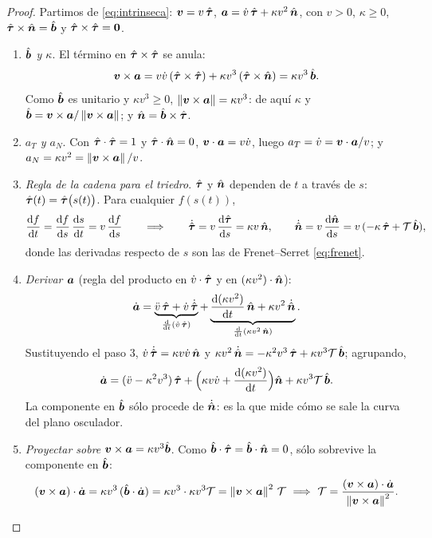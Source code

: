 \begin{proof}
Partimos de \eqref{eq:intrinseca}: $\bm{v}=v\,\hat{\bm{\tau}}$,
$\bm{a}=\dot v\,\hat{\bm{\tau}}+\kappa v^{2}\,\hat{\bm{n}}$, con $v>0$, $\kappa\ge0$,
$\hat{\bm{\tau}}\times\hat{\bm{n}}=\hat{\bm{b}}$ y $\hat{\bm{\tau}}\times\hat{\bm{\tau}}=\bm{0}$.
\begin{enumerate}
  \item \emph{$\hat{\bm{b}}$ y $\kappa$}. El término en $\hat{\bm{\tau}}\times\hat{\bm{\tau}}$ se anula:
  \[
    \bm{v}\times\bm{a}=v\dot v\,(\hat{\bm{\tau}}\times\hat{\bm{\tau}})+\kappa v^{3}\,(\hat{\bm{\tau}}\times\hat{\bm{n}})=\kappa v^{3}\,\hat{\bm{b}} .
  \]
  Como $\hat{\bm{b}}$ es unitario y $\kappa v^{3}\ge0$, $\left\lVert \bm{v}\times\bm{a}\right\rVert=\kappa v^{3}$: de aquí
  $\kappa$ y $\hat{\bm{b}}=\bm{v}\times\bm{a}/\left\lVert \bm{v}\times\bm{a}\right\rVert$; y $\hat{\bm{n}}=\hat{\bm{b}}\times\hat{\bm{\tau}}$.
  \item \emph{$a_{T}$ y $a_{N}$}. Con $\hat{\bm{\tau}}\cdot\hat{\bm{\tau}}=1$ y $\hat{\bm{\tau}}\cdot\hat{\bm{n}}=0$,
  $\bm{v}\cdot\bm{a}=v\dot v$, luego $a_{T}=\dot v=\bm{v}\cdot\bm{a}/v$; y
  $a_{N}=\kappa v^{2}=\left\lVert \bm{v}\times\bm{a}\right\rVert/v$.
  \item \emph{Regla de la cadena para el triedro}. $\hat{\bm{\tau}}$ y $\hat{\bm{n}}$ dependen de $t$
  a través de $s$: $\hat{\bm{\tau}}(t)=\hat{\bm{\tau}}\bigl(s(t)\bigr)$. Para cualquier $f(s(t))$,
  \[
    \od{f}{t}=\od{f}{s}\,\od{s}{t}=v\,\od{f}{s}
    \qquad\Longrightarrow\qquad
    \dot{\utau}=v\,\od{\utau}{s}=\kappa v\,\un,\qquad
    \dot{\un}=v\,\od{\un}{s}=v\,(-\kappa\,\utau+\tors\,\ub),
  \]
  donde las derivadas respecto de $s$ son las de Frenet--Serret \eqref{eq:frenet}.
  \item \emph{Derivar $\bm{a}$} (regla del producto en $\dot v\cdot\hat{\bm{\tau}}$ y en $(\kappa v^{2})\cdot\hat{\bm{n}}$):
  \[
    \dot{\bm{a}}=\underbrace{\ddot v\,\hat{\bm{\tau}}+\dot v\,\dot{\hat{\bm{\tau}}}}_{\frac{\mathop{}\!\mathrm{d} }{\mathop{}\!\mathrm{d} t}(\dot v\,\hat{\bm{\tau}})}
    +\underbrace{\frac{\mathop{}\!\mathrm{d} (\kappa v^{2})}{\mathop{}\!\mathrm{d} t}\,\hat{\bm{n}}+\kappa v^{2}\,\dot{\hat{\bm{n}}}}_{\frac{\mathop{}\!\mathrm{d} }{\mathop{}\!\mathrm{d} t}(\kappa v^{2}\,\hat{\bm{n}})} .
  \]
  Sustituyendo el paso 3, $\dot v\,\dot{\hat{\bm{\tau}}}=\kappa v\dot v\,\hat{\bm{n}}$ y
  $\kappa v^{2}\,\dot{\hat{\bm{n}}}=-\kappa^{2}v^{3}\,\hat{\bm{\tau}}+\kappa v^{3}\mathcal{T}\,\hat{\bm{b}}$; agrupando,
  \[
    \dot{\bm{a}}=(\ddot v-\kappa^{2}v^{3})\,\hat{\bm{\tau}}
    +\Bigl(\kappa v\dot v+\frac{\mathop{}\!\mathrm{d} (\kappa v^{2})}{\mathop{}\!\mathrm{d} t}\Bigr)\hat{\bm{n}}
    +\kappa v^{3}\mathcal{T}\,\hat{\bm{b}} .
  \]
  La componente en $\hat{\bm{b}}$ sólo procede de $\dot{\hat{\bm{n}}}$: es la que mide cómo se sale
  la curva del plano osculador.
  \item \emph{Proyectar sobre $\bm{v}\times\bm{a}=\kappa v^{3}\hat{\bm{b}}$}. Como
  $\hat{\bm{b}}\cdot\hat{\bm{\tau}}=\hat{\bm{b}}\cdot\hat{\bm{n}}=0$, sólo sobrevive la componente en $\hat{\bm{b}}$:
  \[
    (\vb{v}\times\vb{a})\cdot\dot{\vb{a}}=\kappa v^{3}\,(\ub\cdot\dot{\vb{a}})
    =\kappa v^{3}\cdot\kappa v^{3}\tors=\norm{\vb{v}\times\vb{a}}^{2}\,\tors
    \ \Longrightarrow\ \tors=\frac{(\vb{v}\times\vb{a})\cdot\dot{\vb{a}}}{\norm{\vb{v}\times\vb{a}}^{2}}.\qedhere
  \]
\end{enumerate}
\end{proof}

